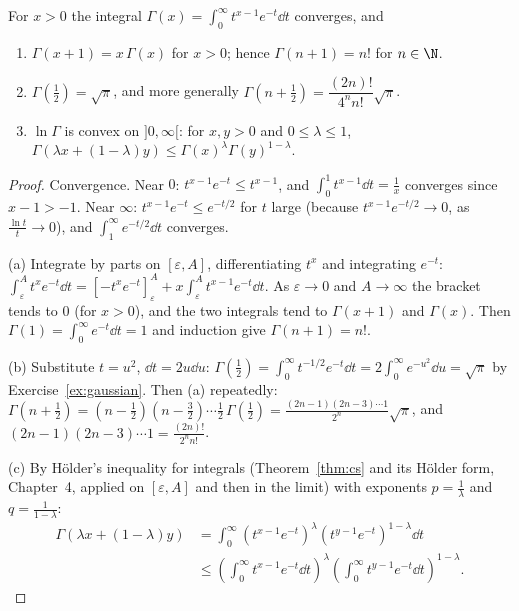 \begin{proposition}\label{prop:gammafn}
For $x>0$ the integral $\Gamma(x)=\displaystyle\int_0^\infty t^{x-1}e^{-t}\dd t$ converges, and
\begin{enumerate}[label=(\alph*)]
\item $\Gamma(x+1)=x\,\Gamma(x)$ for $x>0$; hence $\Gamma(n+1)=n!$ for $n\in\N$.
\item $\Gamma\left(\frac12\right)=\sqrt\pi$, and more generally $\Gamma\left(n+\frac12\right)=\dfrac{(2n)!}{4^nn!}\sqrt\pi$.
\item $\ln\Gamma$ is convex on $]0,\infty[$: for $x,y>0$ and $0\le\lambda\le1$, $\Gamma(\lambda x+(1-\lambda)y)\le\Gamma(x)^\lambda\Gamma(y)^{1-\lambda}$.
\end{enumerate}
\end{proposition}
\begin{proof}
Convergence. Near $0$: $t^{x-1}e^{-t}\le t^{x-1}$, and $\int_0^1t^{x-1}\dd t=\frac1x$ converges since $x-1>-1$. Near $\infty$: $t^{x-1}e^{-t}\le e^{-t/2}$ for $t$ large (because $t^{x-1}e^{-t/2}\to0$, as $\frac{\ln t}{t}\to0$), and $\int_1^\infty e^{-t/2}\dd t$ converges.

(a) Integrate by parts on $[\varepsilon,A]$, differentiating $t^x$ and integrating $e^{-t}$: $\int_\varepsilon^At^xe^{-t}\dd t=\left[-t^xe^{-t}\right]_\varepsilon^A+x\int_\varepsilon^At^{x-1}e^{-t}\dd t$. As $\varepsilon\to0$ and $A\to\infty$ the bracket tends to $0$ (for $x>0$), and the two integrals tend to $\Gamma(x+1)$ and $\Gamma(x)$. Then $\Gamma(1)=\int_0^\infty e^{-t}\dd t=1$ and induction give $\Gamma(n+1)=n!$.

(b) Substitute $t=u^2$, $\dd t=2u\dd u$: $\Gamma\left(\frac12\right)=\int_0^\infty t^{-1/2}e^{-t}\dd t=2\int_0^\infty e^{-u^2}\dd u=\sqrt\pi$ by Exercise~\ref{ex:gaussian}. Then (a) repeatedly: $\Gamma\left(n+\frac12\right)=\left(n-\frac12\right)\left(n-\frac32\right)\cdots\frac12\,\Gamma\left(\frac12\right)=\frac{(2n-1)(2n-3)\cdots1}{2^n}\sqrt\pi$, and $(2n-1)(2n-3)\cdots1=\frac{(2n)!}{2^nn!}$.

(c) By H\"older's inequality for integrals (Theorem~\ref{thm:cs} and its H\"older form, Chapter~4, applied on $[\varepsilon,A]$ and then in the limit) with exponents $p=\frac1\lambda$ and $q=\frac1{1-\lambda}$:
\[
\begin{aligned}\Gamma(\lambda x+(1-\lambda)y)&=\int_0^\infty\left(t^{x-1}e^{-t}\right)^{\lambda}\left(t^{y-1}e^{-t}\right)^{1-\lambda}\dd t\\&\le\left(\int_0^\infty t^{x-1}e^{-t}\dd t\right)^{\lambda}\left(\int_0^\infty t^{y-1}e^{-t}\dd t\right)^{1-\lambda}.\end{aligned}
\]
\end{proof}

